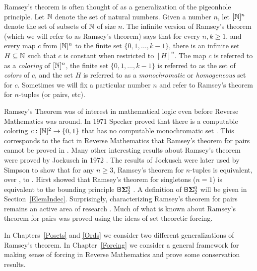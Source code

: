 Ramsey's theorem  is often thought of as
a generalization of the pigeonhole principle.
Let $\mathbb{N}$ denote the set of natural numbers.
Given a number $n$, let $[\mathbb{N}]^n$ denote the
set of subsets of $\mathbb{N}$ of size $n$.
The infinite version of Ramsey's theorem \cite{Ramsey}
(which we will refer to as Ramsey's theorem)
says that for every $n,k\geq 1$, and every map
$c$ from $[\mathbb{N}]^n$ to the finite set $\{0,1,\ldots,k-1\}$,
there is an infinite set $H\subseteq\mathbb{N}$ such that
$c$ is constant when restricted to $[H]^n$.
The map $c$ is referred to as a \textit{coloring} of $[\mathbb{N}]^n$,
the finite set $\{0,1,\ldots,k-1\}$ is referred to as the set of
\textit{colors} of $c$, and the set $H$ is referred to as a
\textit{monochromatic} or \textit{homogeneous} set for $c$.
Sometimes we will fix a particular number $n$ and
refer to Ramsey's theorem for $n$-tuples (or pairs, etc).

Ramsey's Theorem was of interest in mathematical logic
even before Reverse Mathematics was around.
In 1971 Specker proved that there is a computable coloring
$c:[\mathbb{N}]^2\to\{0,1\}$ that has no computable monochromatic set \cite{Specker:1,Specker:2}.
This corresponds to the fact in Reverse Mathematics that
Ramsey's theorem for pairs cannot be proved in \RCAo.
Many other interesting results about Ramsey's theorem
were proved by Jockusch in 1972 \cite{Jockusch:Ramsey}.
The results of Jockusch were later used by Simpson
to show that for any $n\geq 3$, Ramsey's theorem
for $n$-tuples is equivalent, over \RCAo, to \ACAo.
Hirst showed that Ramsey's theorem for singletons ($n=1$)
is equivalent to the bounding principle $\mathsf{B}{\mathbf{\Sigma}^0_2}$ \cite{Hirst:thesis}.
A definition of $\mathsf{B}{\mathbf{\Sigma}^0_2}$ will be given in Section~\ref{ElemIndec}.
Surprisingly, characterizing Ramsey's theorem for pairs remains an active
area of research \cite{SeetapunSlaman,CJS,HirschfeldtShore,DzhafarovHirst,DzhafarovJockusch}.
Much of what is known about Ramsey's theorem for
pairs was proved using the ideas of set theoretic forcing.

In Chapters~\ref{Posets} and \ref{Ords} we consider two different
generalizations of Ramsey's theorem.
In Chapter~\ref{Forcing} we consider a general framework
for making sense of forcing in Reverse Mathematics and prove
some conservation results.
